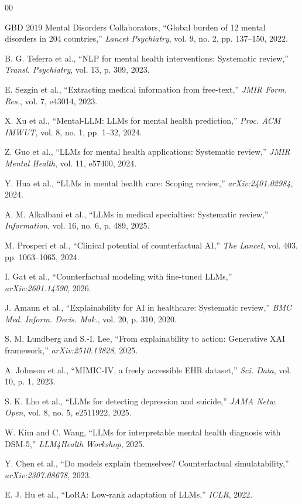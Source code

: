 \documentclass[conference]{IEEEtran}
\begin{document}
\begin{thebibliography}{00}

 GBD 2019 Mental Disorders Collaborators, ``Global burden of 12 mental disorders in 204 countries,'' \textit{Lancet Psychiatry}, vol. 9, no. 2, pp. 137--150, 2022.

 B. G. Teferra et al., ``NLP for mental health interventions: Systematic review,'' \textit{Transl. Psychiatry}, vol. 13, p. 309, 2023.

 E. Sezgin et al., ``Extracting medical information from free-text,'' \textit{JMIR Form. Res.}, vol. 7, e43014, 2023.

 X. Xu et al., ``Mental-LLM: LLMs for mental health prediction,'' \textit{Proc. ACM IMWUT}, vol. 8, no. 1, pp. 1--32, 2024.

 Z. Guo et al., ``LLMs for mental health applications: Systematic review,'' \textit{JMIR Mental Health}, vol. 11, e57400, 2024.

 Y. Hua et al., ``LLMs in mental health care: Scoping review,'' \textit{arXiv:2401.02984}, 2024.

 A. M. Alkalbani et al., ``LLMs in medical specialties: Systematic review,'' \textit{Information}, vol. 16, no. 6, p. 489, 2025.

 M. Prosperi et al., ``Clinical potential of counterfactual AI,'' \textit{The Lancet}, vol. 403, pp. 1063--1065, 2024.

 I. Gat et al., ``Counterfactual modeling with fine-tuned LLMs,'' \textit{arXiv:2601.14590}, 2026.

 J. Amann et al., ``Explainability for AI in healthcare: Systematic review,'' \textit{BMC Med. Inform. Decis. Mak.}, vol. 20, p. 310, 2020.

 S. M. Lundberg and S.-I. Lee, ``From explainability to action: Generative XAI framework,'' \textit{arXiv:2510.13828}, 2025.

 A. Johnson et al., ``MIMIC-IV, a freely accessible EHR dataset,'' \textit{Sci. Data}, vol. 10, p. 1, 2023.

 S. K. Lho et al., ``LLMs for detecting depression and suicide,'' \textit{JAMA Netw. Open}, vol. 8, no. 5, e2511922, 2025.

 W. Kim and C. Wang, ``LLMs for interpretable mental health diagnosis with DSM-5,'' \textit{LLM4Health Workshop}, 2025.

 Y. Chen et al., ``Do models explain themselves? Counterfactual simulatability,'' \textit{arXiv:2307.08678}, 2023.

 E. J. Hu et al., ``LoRA: Low-rank adaptation of LLMs,'' \textit{ICLR}, 2022.

\end{thebibliography}
\end{document}
